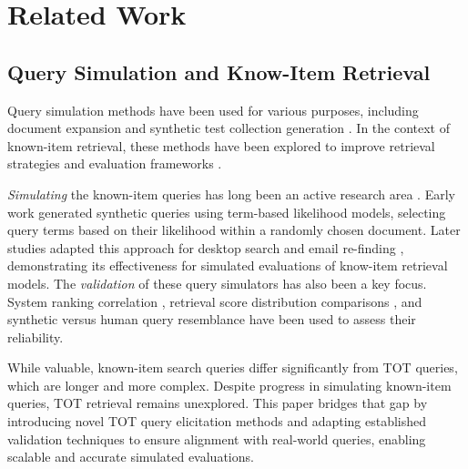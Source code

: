 \section{Related Work}
\subsection{Query Simulation and Know-Item Retrieval}

Query simulation methods have been used for various purposes, including document expansion \cite{nogueira2019docT5query} and synthetic test collection generation \cite{Rahmani24synthetic}. In the context of known-item retrieval, these methods have been explored to improve retrieval strategies \cite{OgilvieCallan03combining} and evaluation frameworks \cite{Azzopardi06testbeds, hagen2015corpus}.



\textit{Simulating} the known-item queries has long been an active research area \cite{balog2006overviewWebclef, Azzopardi07SimulatedQueries, Kim09desktop, Elsweiler2011Seeding}.
Early work \cite{Azzopardi07SimulatedQueries} generated synthetic queries using term-based likelihood models, selecting query terms based on their likelihood within a randomly chosen document. Later studies adapted this approach for desktop search \cite{Kim09desktop} and email re-finding \cite{Elsweiler2011Seeding}, demonstrating its effectiveness for simulated evaluations of know-item retrieval models.
%
The \textit{validation} of these query simulators has also been a key focus.
System ranking correlation \cite{balog2006overviewWebclef}, retrieval score distribution comparisons \cite{Azzopardi07SimulatedQueries}, and synthetic versus human query resemblance \cite{Kim09desktop} have been used to assess their reliability.


While valuable, known-item search queries differ significantly from TOT queries, which are longer and more complex. Despite progress in simulating known-item queries, TOT retrieval remains unexplored. This paper bridges that gap by introducing novel TOT query elicitation methods and adapting established validation techniques \cite{zeigler2000theory} to ensure alignment with real-world queries, enabling scalable and accurate simulated evaluations.






